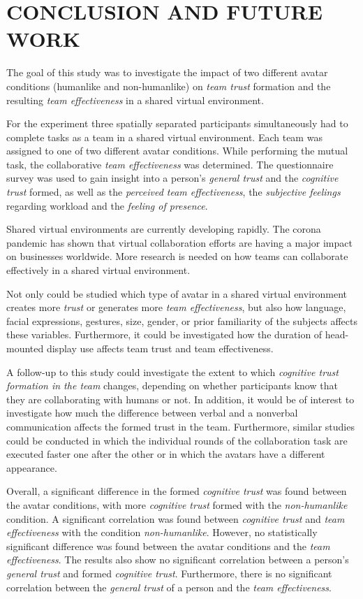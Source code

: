 \documentclass[sigchi]{acmart}
\begin{document}
\section{CONCLUSION AND FUTURE WORK}
The goal of this study was to investigate the impact of two different avatar conditions (humanlike and non-humanlike) on \textit{team trust} formation and the resulting \textit{team effectiveness} in a shared virtual environment. 

For the experiment three spatially separated participants simultaneously had to complete tasks as a team in a shared virtual environment. Each team was assigned to one of two different avatar conditions. While performing the mutual task, the collaborative \textit{team effectiveness} was determined. The questionnaire survey was used to gain insight into a person's \textit{general trust} and the \textit{cognitive trust} formed, as well as the \textit{perceived team effectiveness}, the \textit{subjective feelings} regarding workload and the \textit{feeling of presence}.

Shared virtual environments are currently developing rapidly. The corona pandemic has shown that virtual collaboration efforts are having a major impact on businesses worldwide. More research is needed on how teams can collaborate effectively in a shared virtual environment.

Not only could be studied which type of avatar in a shared virtual environment creates more \textit{trust} or generates more \textit{team effectiveness}, but also how language, facial expressions, gestures, size, gender, or prior familiarity of the subjects affects these variables.
Furthermore, it could be investigated how the duration of head-mounted display use affects team trust and team effectiveness.

A follow-up to this study could investigate the extent to which \textit{cognitive trust formation in the team} changes, depending on whether participants know that they are collaborating with humans or not. In addition, it would be of interest to investigate how much the difference between verbal and a nonverbal communication affects the formed trust in the team.  
Furthermore, similar studies could be conducted in which the individual rounds of the collaboration task are executed faster one after the other or in which the avatars have a different appearance.

Overall, a significant difference in the formed \textit{cognitive trust} was found between the avatar conditions, with more \textit{cognitive trust} formed with the \textit{non-humanlike} condition. A significant correlation was found between \textit{cognitive trust} and \textit{team effectiveness} with the condition \textit{non-humanlike}. However, no statistically significant difference was found between the avatar conditions and the \textit{team effectiveness}. The results also show no significant correlation between a person's \textit{general trust} and formed \textit{cognitive trust}. Furthermore, there is no significant correlation between the \textit{general trust} of a person and the \textit{team effectiveness}.
\end{document}

